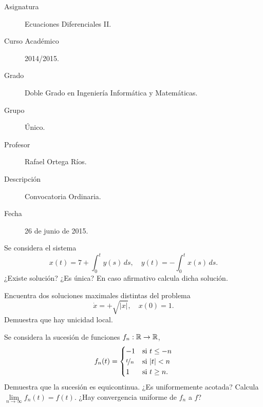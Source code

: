\documentclass[12pt]{article}
\begin{document}

    
    

    \begin{description}
        \item[Asignatura] Ecuaciones Diferenciales II.
        \item[Curso Académico] 2014/2015.
        \item[Grado] Doble Grado en Ingeniería Informática y Matemáticas.
        \item[Grupo] Único.
        \item[Profesor] Rafael Ortega Ríos.
        \item[Descripción] Convocatoria Ordinaria.
        \item[Fecha] 26 de junio de 2015.
    
    \end{description}
    \newpage


    
    \begin{ejercicio}
        Se considera el sistema
        \[ x(t) = 7 + \int_{0}^{t} y(s) \, ds, \quad y(t) = -\int_{0}^{t} x(s) \, ds. \]
        ¿Existe solución? ¿Es única? En caso afirmativo calcula dicha solución.
    \end{ejercicio}

    \begin{ejercicio}
        Encuentra dos soluciones maximales distintas del problema
        \[ \dot{x} = +\sqrt{|x|}, \quad x(0) = 1. \]
        Demuestra que hay unicidad local.
    \end{ejercicio}

    \begin{ejercicio}
        Se considera la sucesión de funciones $f_n: \mathbb{R} \to \mathbb{R}$,
        \[ f_n(t) = \begin{cases} -1 & \text{si } t \leq -n \\ \nicefrac{t}{n} & \text{si } |t| < n \\ 1 & \text{si } t \geq n. \end{cases} \]
        Demuestra que la sucesión es equicontinua. ¿Es uniformemente acotada? Calcula $\lim\limits_{n \to \infty} f_n(t) = f(t)$. ¿Hay convergencia uniforme de $f_n$ a $f$?
    \end{ejercicio}
\end{document}
